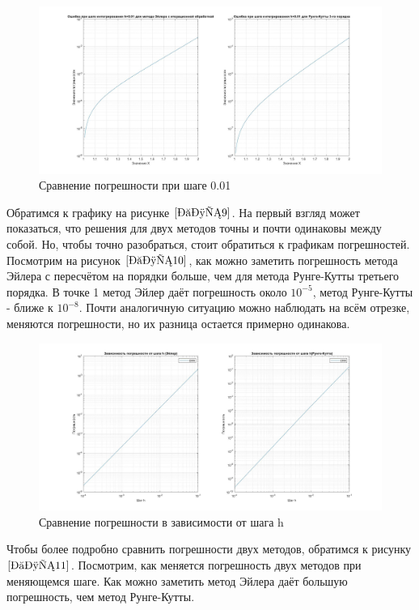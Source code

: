 \documentclass[a4paper]{article}
\begin{document}
\begin{figure}[h!]
\begin{center}
\includegraphics[scale=0.3]{сравнение ошибка при шаге.jpg} 
\end{center}
\caption{Сравнение погрешности при шаге 0.01} \label{Рис10}
\end{figure}

Обратимся к графику на рисунке $\ref{Рис9}$. На первый взгляд может показаться, что решения для двух методов точны и почти одинаковы между собой. Но, чтобы точно разобраться, стоит обратиться к графикам погрешностей. Посмотрим на рисунок $\ref{Рис10}$, как можно заметить погрешность метода Эйлера с пересчётом на порядки больше, чем для метода Рунге-Кутты третьего порядка. В точке 1 метод Эйлер даёт погрешность около $10^{-5}$, метод Рунге-Кутты - ближе к $10^{-8}$. Почти аналогичную ситуацию можно наблюдать на всём отрезке, меняются погрешности, но их разница остается примерно одинакова. 

\begin{figure}[h!]
\begin{center}
\includegraphics[scale=0.3]{сравнение от шага.jpg} 
\end{center}
\caption{Сравнение погрешности в зависимости от шага h} \label{Рис11}
\end{figure}
Чтобы более подробно сравнить погрешности двух методов, обратимся к рисунку $\ref{Рис11}$. Посмотрим, как меняется погрешность двух методов при меняющемся шаге. Как можно заметить метод Эйлера даёт большую погрешность, чем метод Рунге-Кутты.
\end{document}
